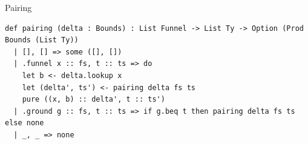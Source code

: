 \begin{cmp}{Pairing}
\begin{paperside}
\end{paperside}
\begin{leanside}
\begin{lstlisting}[style=leanside]
def pairing (delta : Bounds) : List Funnel -> List Ty -> Option (Prod Bounds (List Ty))
  | [], [] => some ([], [])
  | .funnel x :: fs, t :: ts => do
    let b <- delta.lookup x
    let (delta', ts') <- pairing delta fs ts
    pure ((x, b) :: delta', t :: ts')
  | .ground g :: fs, t :: ts => if g.beq t then pairing delta fs ts else none
  | _, _ => none
\end{lstlisting}
\end{leanside}
\end{cmp}

